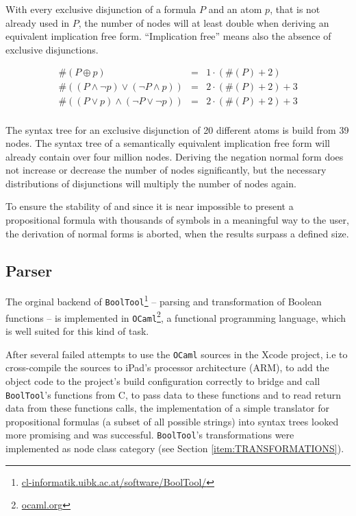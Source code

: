 With every exclusive disjunction of a formula $P$ and an atom $p$, 
that is not already used in $P$,
the number of nodes will at least double 
when deriving an equivalent implication free form.
“Implication free” means also the absence of exclusive disjunctions. %

\begin{eqnarray*}
\#(P \oplus p) & = & 1 \cdot(\#(P) + 2) \\
\#((P \wedge \neg p) \vee  (\neg P \wedge p)) & = & 2 \cdot (\#(P) + 2) + 3 \\
\#((P \vee p) \wedge  (\neg P \vee \neg p)) & = & 2 \cdot (\#(P) + 2) + 3 \\
\end{eqnarray*}

The syntax tree for an exclusive disjunction of 20 different atoms is build from 39 nodes.
The syntax tree of a semantically equivalent implication free form will already contain over four million nodes.
Deriving the negation normal form does not increase or decrease the number of nodes significantly,
but the necessary distributions of disjunctions will multiply the number of nodes again.

To ensure the stability of \Nyaya 
and since it is near impossible 
to present a propositional formula 
with thousands of symbols 
in a meaningful way
to the user, 
the derivation of normal forms is aborted, when the results surpass a defined size.



\subsection{Parser}
\label{sec:Parser}

The orginal backend of \verb+BoolTool+\footnote{
\href{http://cl-informatik.uibk.ac.at/software/BoolTool/}{cl-informatik.uibk.ac.at/software/BoolTool/}} 
– parsing and transformation of Boolean functions – 
is implemented in \verb+OCaml+\footnote{
\href{http://ocaml.org}{ocaml.org}}, 
a functional programming language, which is well suited for this kind of task.

After several failed attempts to use the \verb+OCaml+ sources in the Xcode project, 
i.e to cross-compile the sources to iPad's processor architecture (ARM),
to add the object code to the project's build configuration correctly 
to bridge and call \verb+BoolTool+'s functions from C, 
to pass data to these functions and to read return data from these functions calls,
the implementation of a simple translator 
for propositional formulas (a subset of all possible strings)
into syntax trees looked more promising and was successful. 
\verb=BoolTool='s transformations were implemented as node class category (see Section \vref{item:TRANSFORMATIONS}).

